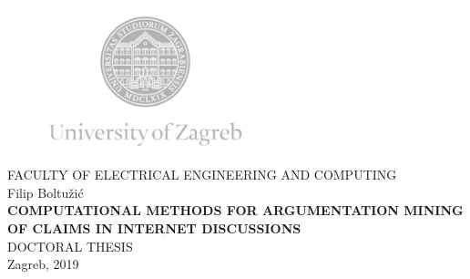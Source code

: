 \frontmatter

\begin{titlepage}
  \fontsize{16pt}{20pt}\selectfont
  \selectfont
  \setlength{\intextsep}{0pt plus 0pt minus 0pt}

  \begin{center}
    \begin{figure}[ht!]
      \begin{center}
        \includegraphics[height=4.1184cm, width=5.94cm]{logo_unizg_eng}
      \end{center}
    \end{figure}
    \vspace{0cm}
    {FACULTY OF ELECTRICAL ENGINEERING AND COMPUTING} \\
    \vspace{3cm}
    Filip Boltužić \\
    \vspace{2cm}
    {\fontsize{22pt}{22pt}\selectfont
\textbf{
COMPUTATIONAL METHODS FOR ARGUMENTATION MINING OF CLAIMS IN INTERNET DISCUSSIONS}} \\
    \vspace{2cm}  
    DOCTORAL THESIS \\    
    \vfill{Zagreb, 2019}
  \end{center}
  \restoregeometry
\end{titlepage}

